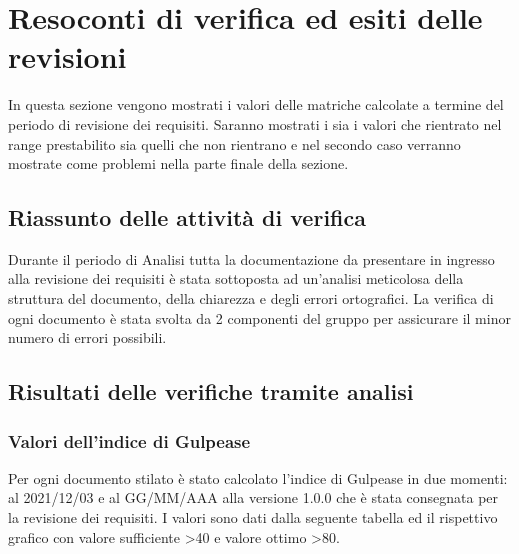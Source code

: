 \section{Resoconti di verifica ed esiti delle revisioni}

In questa sezione vengono mostrati i valori delle matriche calcolate a termine del periodo di revisione dei requisiti. Saranno mostrati i sia i valori che rientrato nel range prestabilito sia quelli che non rientrano e nel secondo caso verranno mostrate come problemi nella parte finale della sezione.

\subsection{Riassunto delle attività di verifica}
Durante il periodo di Analisi tutta la documentazione da presentare in ingresso alla revisione dei requisiti è stata sottoposta ad un'analisi meticolosa della struttura del documento, della chiarezza e degli errori ortografici. La verifica di ogni documento è stata svolta da 2 componenti del gruppo per assicurare il minor numero di errori possibili.

\subsection{Risultati delle verifiche tramite analisi}

\subsubsection{Valori dell'indice di Gulpease}

Per ogni documento stilato è stato calcolato l'indice di Gulpease\glo{} in due momenti: al 2021/12/03 e al GG/MM/AAA alla versione 1.0.0 che è stata consegnata per la revisione dei requisiti. I valori sono dati dalla seguente tabella ed il rispettivo grafico con valore sufficiente >40 e valore ottimo >80.

\hphantom{}
\renewcommand*{\arraystretch}{1.4}
\setlength{\tabcolsep}{10pt} %

